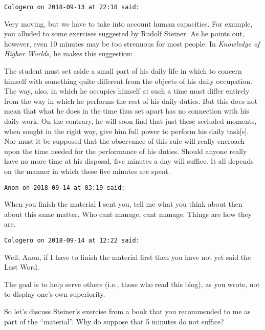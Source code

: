 \begin{footnotesize}\begin{sffamily}



\texttt{Cologero on 2018-09-13 at 22:18 said: }

Very moving, but we have to take into account human capacities. For example, you alluded to some exercises suggested by Rudolf Steiner. As he points out, however, even 10 minutes may be too strenuous for most people. In \emph{Knowledge of Higher Worlds}, he makes this suggestion:

\begin{quotex}
The student must set aside a small part of his daily life in which to concern himself with something quite different from the objects of his daily occupation. The way, also, in which he occupies himself at such a time must differ entirely from the way in which he performs the rest of his daily duties. But this does not mean that what he does in the time thus set apart has no connection with his daily work. On the contrary, he will soon find that just these secluded moments, when sought in the right way, give him full power to perform his daily task[s]. Nor must it be supposed that the observance of this rule will really encroach upon the time needed for the performance of his duties. Should anyone really have no more time at his disposal, five minutes a day will suffice. It all depends on the manner in which these five minutes are spent. 

\end{quotex}

\hfill

\texttt{Anon on 2018-09-14 at 03:19 said: }

When you finish the material I sent you, tell me what you think about then about this same matter. Who cant manage, cant manage. Things are how they are.


\hfill

\texttt{Cologero on 2018-09-14 at 12:22 said: }

Well, Anon, if I have to finish the material first then you have not yet said the Last Word.

The goal is to help serve others (i.e., those who read this blog), as you wrote, not to display one's own superiority.

So let's discuss Steiner's exercise from a book that you recommended to me as part of the “material”. Why do suppose that 5 minutes do not suffice?


\end{sffamily}
\end{footnotesize}

